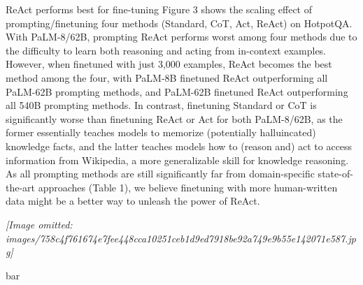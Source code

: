 \documentclass[
]{article}
\begin{document}
ReAct performs best for fine-tuning Figure 3 shows the scaling effect of
prompting/finetuning four methods (Standard, CoT, Act, ReAct) on
HotpotQA. With PaLM-8/62B, prompting ReAct performs worst among four
methods due to the difficulty to learn both reasoning and acting from
in-context examples. However, when finetuned with just 3,000 examples,
ReAct becomes the best method among the four, with PaLM-8B finetuned
ReAct outperforming all PaLM-62B prompting methods, and PaLM-62B
finetuned ReAct outperforming all 540B prompting methods. In contrast,
finetuning Standard or CoT is significantly worse than finetuning ReAct
or Act for both PaLM-8/62B, as the former essentially teaches models to
memorize (potentially halluincated) knowledge facts, and the latter
teaches models how to (reason and) act to access information from
Wikipedia, a more generalizable skill for knowledge reasoning. As all
prompting methods are still significantly far from domain-specific
state-of-the-art approaches (Table 1), we believe finetuning with more
human-written data might be a better way to unleash the power of ReAct.

\textit{[Image omitted: images/758c4f761674e7fee448cca10251ceb1d9ed7918be92a749e9b55e142071e587.jpg]}

bar
\end{document}
